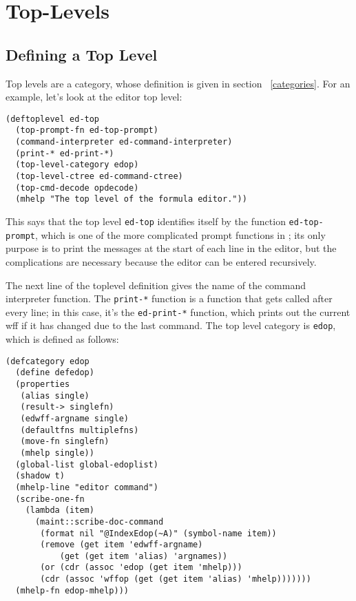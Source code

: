 \chapter{Top-Levels}\label{toplev}

\section{Defining a Top Level}

Top levels are a \TPS category, whose definition is given in section ~\ref{categories}.
For an example, let's look at the editor top level:

\begin{verbatim}
(deftoplevel ed-top
  (top-prompt-fn ed-top-prompt)
  (command-interpreter ed-command-interpreter)
  (print-* ed-print-*)
  (top-level-category edop)
  (top-level-ctree ed-command-ctree)
  (top-cmd-decode opdecode)
  (mhelp "The top level of the formula editor."))
\end{verbatim}

This says that the top level {\tt ed-top} identifies itself by the function {\tt ed-top-prompt},
which is one of the more complicated prompt functions in \TPS; its only purpose is to 
print the {\tt <ed34>} messages at the start of each line in the editor, but the complications
are necessary because the editor can be entered recursively.

The next line of the toplevel definition gives the name of the command interpreter function.
The {\tt print-*} function is a function that gets called after every line; in this case, it's the
{\tt ed-print-*} function, which prints out the current wff if it has changed due to the last command.
The top level category is {\tt edop}, which is defined as follows:

\begin{verbatim}
(defcategory edop
  (define defedop)
  (properties
   (alias single)
   (result-> singlefn)
   (edwff-argname single)
   (defaultfns multiplefns)
   (move-fn singlefn)
   (mhelp single))
  (global-list global-edoplist)
  (shadow t)
  (mhelp-line "editor command")
  (scribe-one-fn
    (lambda (item)
      (maint::scribe-doc-command 
       (format nil "@IndexEdop(~A)" (symbol-name item))
       (remove (get item 'edwff-argname) 
	       (get (get item 'alias) 'argnames))
       (or (cdr (assoc 'edop (get item 'mhelp)))
	   (cdr (assoc 'wffop (get (get item 'alias) 'mhelp)))))))
  (mhelp-fn edop-mhelp)))
\end{verbatim}

